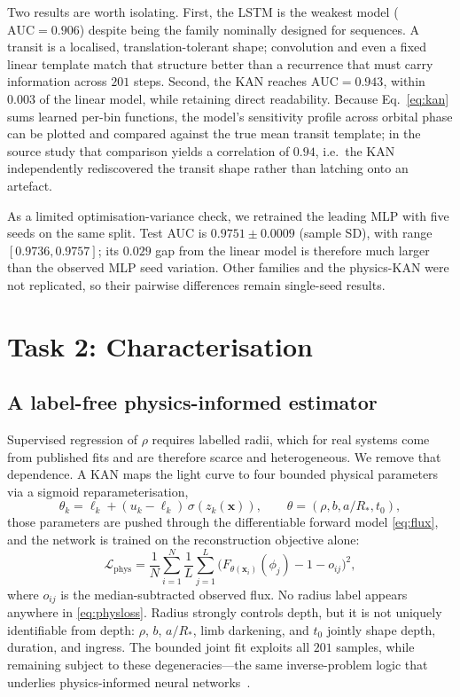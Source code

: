 \documentclass[manuscript,nonacm]{acmart}
\begin{document}
Two results are worth isolating. First, the LSTM is the weakest model
($\mathrm{AUC}=0.906$) despite being the family nominally designed for sequences. A
transit is a localised, translation-tolerant shape; convolution and even a fixed linear
template match that structure better than a recurrence that must carry information
across $201$ steps. Second, the KAN reaches $\mathrm{AUC}=0.943$, within $0.003$ of the
linear model, while retaining direct readability. Because Eq.~\eqref{eq:kan} sums learned
per-bin functions, the model's sensitivity profile across orbital phase can be plotted
and compared against the true mean transit template; in the source study that
comparison yields a correlation of $0.94$, i.e.\ the KAN independently rediscovered the
transit shape rather than latching onto an artefact.

As a limited optimisation-variance check, we retrained the leading MLP with five seeds
on the same split. Test AUC is $0.9751\pm0.0009$ (sample SD), with range
$[0.9736,0.9757]$; its $0.029$ gap from the linear model is therefore much larger than
the observed MLP seed variation. Other families and the physics-KAN were not replicated,
so their pairwise differences remain single-seed results.

\section{Task 2: Characterisation}
\label{sec:physkan}

\subsection{A label-free physics-informed estimator}
Supervised regression of $\rho$ requires labelled radii, which for real systems come
from published fits and are therefore scarce and heterogeneous. We remove that
dependence. A KAN maps the light curve to four bounded physical parameters via a sigmoid
reparameterisation,
\begin{equation}
\theta_k = \ell_k+(u_k-\ell_k)\,\sigma\!\left(z_k(\mathbf{x})\right),
\qquad \theta=(\rho,b,a/R_*,t_0),
\label{eq:reparam}
\end{equation}
those parameters are pushed through the differentiable forward model
\eqref{eq:flux}, and the network is trained on the reconstruction objective alone:
\begin{equation}
\mathcal{L}_{\mathrm{phys}}
 =\frac{1}{N}\sum_{i=1}^{N}\frac{1}{L}\sum_{j=1}^{L}
 \Big(F_{\theta(\mathbf{x}_i)}(\phi_j)-1-o_{ij}\Big)^{2},
\label{eq:physloss}
\end{equation}
where $o_{ij}$ is the median-subtracted observed flux. No radius label appears anywhere
in \eqref{eq:physloss}. Radius strongly controls depth, but it is not uniquely
identifiable from depth: $\rho$, $b$, $a/R_*$, limb darkening, and $t_0$ jointly shape
depth, duration, and ingress. The bounded joint fit exploits all $201$ samples, while
remaining subject to these degeneracies---the same inverse-problem logic that underlies
physics-informed neural networks~\cite{raissi2019pinn}.
\end{document}
